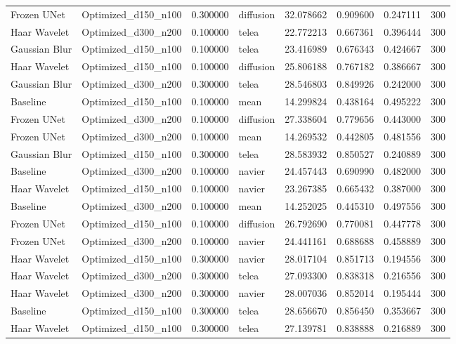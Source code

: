 \begin{table}[h]
\begin{tabular}{llrlrrrr}
Frozen UNet & Optimized\_d150\_n100 & 0.300000 & diffusion & 32.078662 & 0.909600 & 0.247111 & 300 \\
Haar Wavelet & Optimized\_d300\_n200 & 0.100000 & telea & 22.772213 & 0.667361 & 0.396444 & 300 \\
Gaussian Blur & Optimized\_d150\_n100 & 0.100000 & telea & 23.416989 & 0.676343 & 0.424667 & 300 \\
Haar Wavelet & Optimized\_d150\_n100 & 0.100000 & diffusion & 25.806188 & 0.767182 & 0.386667 & 300 \\
Gaussian Blur & Optimized\_d300\_n200 & 0.300000 & telea & 28.546803 & 0.849926 & 0.242000 & 300 \\
Baseline & Optimized\_d150\_n100 & 0.100000 & mean & 14.299824 & 0.438164 & 0.495222 & 300 \\
Frozen UNet & Optimized\_d300\_n200 & 0.100000 & diffusion & 27.338604 & 0.779656 & 0.443000 & 300 \\
Frozen UNet & Optimized\_d300\_n200 & 0.100000 & mean & 14.269532 & 0.442805 & 0.481556 & 300 \\
Gaussian Blur & Optimized\_d150\_n100 & 0.300000 & telea & 28.583932 & 0.850527 & 0.240889 & 300 \\
Baseline & Optimized\_d300\_n200 & 0.100000 & navier & 24.457443 & 0.690990 & 0.482000 & 300 \\
Haar Wavelet & Optimized\_d150\_n100 & 0.100000 & navier & 23.267385 & 0.665432 & 0.387000 & 300 \\
Baseline & Optimized\_d300\_n200 & 0.100000 & mean & 14.252025 & 0.445310 & 0.497556 & 300 \\
Frozen UNet & Optimized\_d150\_n100 & 0.100000 & diffusion & 26.792690 & 0.770081 & 0.447778 & 300 \\
Frozen UNet & Optimized\_d300\_n200 & 0.100000 & navier & 24.441161 & 0.688688 & 0.458889 & 300 \\
Haar Wavelet & Optimized\_d150\_n100 & 0.300000 & navier & 28.017104 & 0.851713 & 0.194556 & 300 \\
Haar Wavelet & Optimized\_d300\_n200 & 0.300000 & telea & 27.093300 & 0.838318 & 0.216556 & 300 \\
Haar Wavelet & Optimized\_d300\_n200 & 0.300000 & navier & 28.007036 & 0.852014 & 0.195444 & 300 \\
Baseline & Optimized\_d150\_n100 & 0.300000 & telea & 28.656670 & 0.856450 & 0.353667 & 300 \\
Haar Wavelet & Optimized\_d150\_n100 & 0.300000 & telea & 27.139781 & 0.838888 & 0.216889 & 300 \\

\end{tabular}
\end{table}
